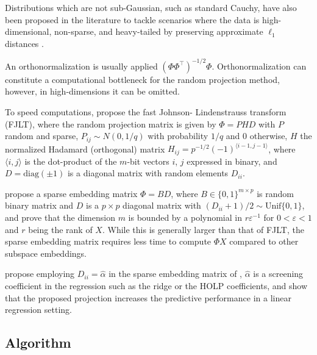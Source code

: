 \documentclass[
  article]{jss}
\begin{document}
Distributions which are not sub-Gaussian, such as standard Cauchy, have
also been proposed in the literature to tackle scenarios where the data
is high-dimensional, non-sparse, and heavy-tailed by preserving
approximate \(\ell_1\) distances \citep[see e.g.,][]{li2007nonlinear}.

An orthonormalization is usually applied \((\Phi\Phi^\top)^{-1/2}\Phi\).
Orthonormalization can constitute a computational bottleneck for the
random projection method, however, in high-dimensions it can be omitted.

To speed computations, \citet{ailon2009fast} propose the fast Johnson-
Lindenstrauss transform (FJLT), where the random projection matrix is
given by \(\Phi=PHD\) with \(P\) random and sparse,
\(P_{ij} \sim N (0, 1/q)\) with probability \(1/q\) and \(0\) otherwise,
\(H\) the normalized Hadamard (orthogonal) matrix
\(H_{ij} = p^{-1/2}(-1)^{\langle i-1,j-1\rangle}\), where
\(\langle i, j\rangle\) is the dot-product of the \(m\)-bit vectors
\(i\), \(j\) expressed in binary, and \(D = \text{diag}(\pm 1)\) is a
diagonal matrix with random elements \(D_{ii}\).

\citet{Clarkson2013LowRankApproxShort} propose a sparse embedding matrix
\({\Phi=BD}\), where \(B\in\{0,1\}^{m \times p}\) is random binary
matrix and \(D\) is a \(p\times p\) diagonal matrix with
\((D_{ii}+1)/2\sim \text{Unif}\{0,1\}\), and prove that the dimension
\(m\) is bounded by a polynomial in \(r\varepsilon^{-1}\) for
\(0 <\varepsilon< 1\) and \(r\) being the rank of \(X\). While this is
generally larger than that of FJLT, the sparse embedding matrix requires
less time to compute \(\Phi X\) compared to other subspace embeddings.

\citet{parzer2024sparse} propose employing \({D_{ii}=\hat \alpha}\) in
the sparse embedding matrix of \citet{Clarkson2013LowRankApproxShort},
\(\hat \alpha\) is a screening coefficient in the regression such as the
ridge or the HOLP coefficients, and show that the proposed projection
increases the predictive performance in a linear regression setting.

\subsection{Algorithm}\label{algorithm}
\end{document}
